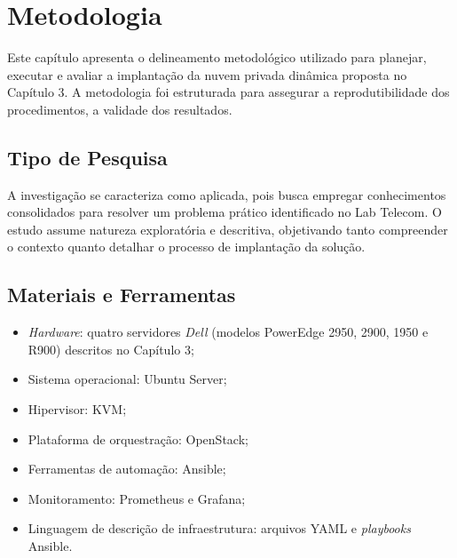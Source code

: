 
\chapter{Metodologia}
\setcounter{table}{0}

Este capítulo apresenta o delineamento metodológico utilizado para planejar, executar e avaliar a implantação da nuvem privada dinâmica proposta no Capítulo 3. A metodologia foi estruturada para assegurar a reprodutibilidade dos procedimentos, a validade dos resultados.

\section{Tipo de Pesquisa}
A investigação se caracteriza como aplicada, pois busca empregar conhecimentos consolidados para resolver um problema prático identificado no Lab Telecom. O estudo assume natureza exploratória e descritiva, objetivando tanto compreender o contexto quanto detalhar o processo de implantação da solução.

\section{Materiais e Ferramentas}
\begin{itemize}
    \item \textit{Hardware}: quatro servidores \textit{Dell} (modelos PowerEdge 2950, 2900, 1950 e R900) descritos no Capítulo 3;
    \item Sistema operacional: Ubuntu Server;
    \item Hipervisor: KVM;
    \item Plataforma de orquestração: OpenStack;
    \item Ferramentas de automação: Ansible;
    \item Monitoramento: Prometheus e Grafana;
    \item Linguagem de descrição de infraestrutura: arquivos YAML e \textit{playbooks} Ansible.
\end{itemize}

